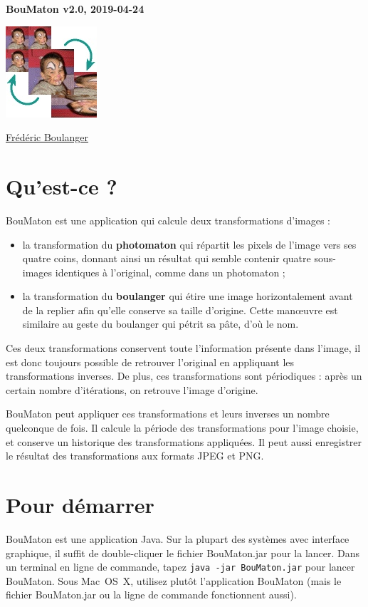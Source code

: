 \documentclass[a4paper]{article}
\newcommand{\bouVersion}{2.0\xspace}
\newcommand{\bouRelease}{2019-04-24\xspace}
\newcommand{\BouMaton}{\textsf{BouMaton}\xspace}
\newcommand{\filename}[1]{\textsf{#1}}
\begin{document}
  \begin{center}
    \textsf{\textbf{\large BouMaton v\bouVersion, \bouRelease}}
    
    \includegraphics[scale=0.5]{icone}
    
    \href{mailto:Frederic.Boulanger@centralesupelec.fr}{\textsf{Frédéric Boulanger}}
  \end{center}
  
  
  \section{Qu'est-ce ?}
  \BouMaton est une application qui calcule deux transformations 
  d'images :
  \begin{itemize}
    \item la transformation du \textbf{photomaton} qui répartit les 
    pixels de l'image vers ses quatre coins, donnant ainsi un résultat 
    qui semble contenir quatre sous-images identiques à l'original, 
    comme dans un photomaton ;
    
    \item la transformation du \textbf{boulanger} qui étire une image 
    horizontalement avant de la replier afin qu'elle conserve sa taille 
    d'origine. Cette manœuvre est similaire au geste du boulanger qui 
    pétrit sa pâte, d'où le nom.
  \end{itemize}
  
  Ces deux transformations conservent toute l'information présente 
  dans l'image, il est donc toujours possible de retrouver l'original 
  en appliquant les transformations inverses. De plus, ces 
  transformations sont périodiques : après un certain nombre 
  d'itérations, on retrouve l'image d'origine.
  
  \BouMaton peut appliquer ces transformations et leurs inverses un 
  nombre quelconque de fois. Il calcule la période des transformations 
  pour l'image choisie, et conserve un historique des transformations 
  appliquées. Il peut aussi enregistrer le résultat des transformations 
  aux formats JPEG et PNG.
    
  \section{Pour démarrer}
  \BouMaton est une application Java. Sur la plupart des systèmes
  avec interface graphique, il suffit de double-cliquer le fichier
  \filename{BouMaton.jar} pour la lancer. Dans un terminal en ligne de
  commande, tapez \verb|java -jar BouMaton.jar| pour lancer \BouMaton.
  Sous Mac~OS~X, utilisez plutôt l'application \filename{BouMaton}
  (mais le fichier \filename{BouMaton.jar} ou la ligne de commande
  fonctionnent aussi).
  
\end{document}

